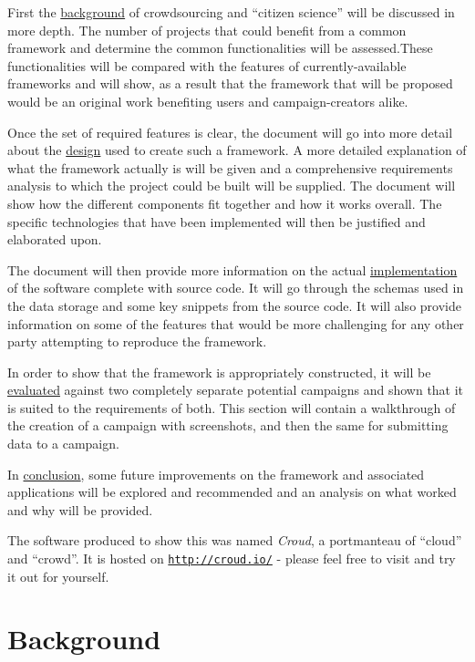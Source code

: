 \documentclass{article}
\let\oldsection\section
\renewcommand\section{\clearpage\oldsection}
\begin{document}
		First the \hyperref[sec:background]{background} of crowdsourcing and ``citizen science'' will be discussed in more depth. The number of projects that could benefit from a common framework and determine the common functionalities will be assessed.These functionalities will be compared with the features of currently-available frameworks and will show, as a result that the framework that will be proposed would be an original work benefiting users and campaign-creators alike.

		Once the set of required features is clear, the document will go into more detail about the \hyperref[sec:architecture]{design} used to create such a framework. A more detailed explanation of what the framework actually is will be given and a comprehensive requirements analysis to which the project could be built will be supplied. The document will show how the different components fit together and how it works overall. The specific technologies that have been implemented will then be justified and elaborated upon.

		The document will then provide more information on the actual \hyperref[sec:implementation]{implementation} of the software complete with source code. It will go through the schemas used in the data storage and some key snippets from the source code. It will also provide information on some of the features that would be more challenging for any other party attempting to reproduce the framework.

		In order to show that the framework is appropriately constructed, it will be \hyperref[sec:evaluation]{evaluated} against two completely separate potential campaigns and shown that it is suited to the requirements of both. This section will contain a walkthrough of the creation of a campaign with screenshots, and then the same for submitting data to a campaign.

		In \hyperref[sec:conclusion]{conclusion}, some future improvements on the framework and associated applications will be explored and recommended and an analysis on what worked and why will be provided.

		The software produced to show this was named \emph{Croud}, a portmanteau of ``cloud'' and ``crowd''. It is hosted on \href{http://croud.io/}{\nolinkurl{http://croud.io/}} - please feel free to visit and try it out for yourself.

	\section{Background}
	\label{sec:background}
\end{document}
